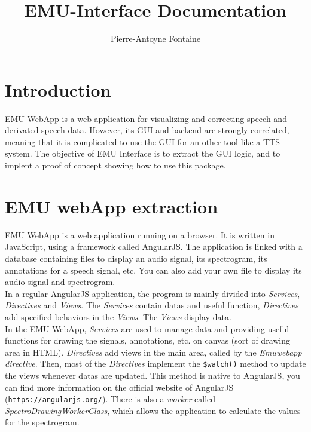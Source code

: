 \documentclass{article}
\title{EMU-Interface Documentation}
\author{Pierre-Antoyne Fontaine}
\begin{document}
\maketitle

\section*{Introduction}

EMU WebApp is a web application for visualizing and correcting speech and derivated speech data. However, its GUI and backend are strongly correlated, meaning that it is complicated to use the GUI for an other tool like a TTS system. The objective of EMU Interface is to extract the GUI logic, and to implent a proof of concept showing how to use this package.

\section{EMU webApp extraction}

EMU WebApp is a web application running on a browser. It is written in JavaScript, using a framework called AngularJS. 
The application is linked with a database containing files to display an audio signal, its spectrogram, its annotations for a speech signal, etc. You can also add your own file to display its audio signal and spectrogram. \\

In a regular AngularJS application, the program is mainly divided into \textit{Services}, \textit{Directives} and \textit{Views}. The \textit{Services} contain datas and useful function, \textit{Directives} add specified behaviors in the \textit{Views}. The \textit{Views} display data.  \\

In the EMU WebApp, \textit{Services} are used to manage data and providing useful functions for drawing the signals, annotations, etc. on canvas (sort of drawing area in HTML).
\textit{Directives} add views in the main area, called by the \textit{Emuwebapp directive}. Then, most of the \textit{Directives} implement the \texttt{\$watch()} method to update the views whenever datas are updated. This method is native to AngularJS, you can find more information on the official website of AngularJS (\texttt{https://angularjs.org/}). 
There is also a \textit{worker} called \textit{SpectroDrawingWorkerClass}, which allows the application to calculate the values for the spectrogram. \\
\end{document}
